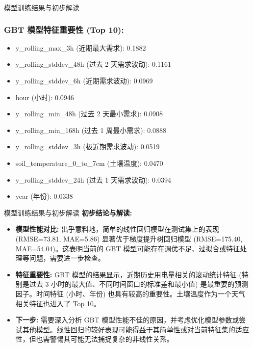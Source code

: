 \documentclass{beamer} %
\begin{document}
\begin{frame}{模型训练结果与初步解读}
    \frametitle{GBT 模型特征重要性 (Top 10):}
    \begin{itemize}
        \item y\_rolling\_max\_3h (近期最大需求): 0.1882
        \item y\_rolling\_stddev\_48h (过去 2 天需求波动): 0.1161
        \item y\_rolling\_stddev\_6h (近期需求波动): 0.0969
        \item hour (小时): 0.0946
        \item y\_rolling\_min\_48h (过去 2 天最小需求): 0.0908
        \item y\_rolling\_min\_168h (过去 1 周最小需求): 0.0888
        \item y\_rolling\_stddev\_3h (极近期需求波动): 0.0519
        \item soil\_temperature\_0\_to\_7cm (土壤温度): 0.0470
        \item y\_rolling\_stddev\_24h (过去 1 天需求波动): 0.0394
        \item year (年份): 0.0338
    \end{itemize}
\end{frame}

\begin{frame}{模型训练结果与初步解读}
    \textbf{初步结论与解读:}
    \begin{itemize}
        \item \textbf{模型性能对比:} 出乎意料地，简单的线性回归模型在测试集上的表现 (RMSE=73.81, MAE=5.86) 显著优于梯度提升树回归模型 (RMSE=175.40, MAE=54.04)。这表明当前的 GBT 模型可能存在调优不足、过拟合或特征处理等问题，需要进一步检查。
        \item \textbf{特征重要性:} GBT 模型的结果显示，近期历史用电量相关的滚动统计特征 (特别是过去 3 小时的最大值、不同时间窗口的标准差和最小值) 是最重要的预测因子。时间特征 (小时、年份) 也具有较高的重要性。土壤温度作为一个天气相关特征也进入了 Top 10。
        \item \textbf{下一步:} 需要深入分析 GBT 模型性能不佳的原因，并考虑优化模型参数或尝试其他模型。线性回归的较好表现可能得益于其简单性或对当前特征集的适应性，但也需警惕其可能无法捕捉复杂的非线性关系。
    \end{itemize}
\end{frame}
\end{document}

